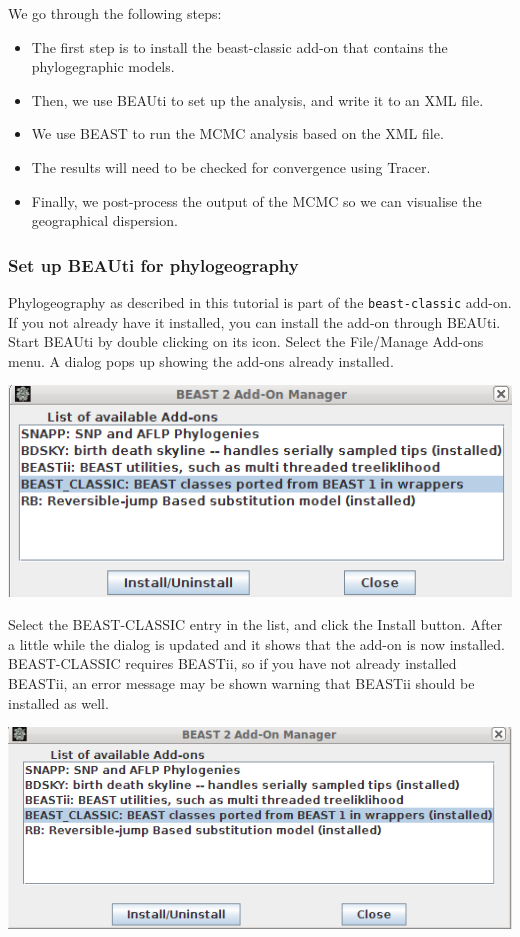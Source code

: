 \documentclass{article}
\begin{document}
We go through the following steps:
\begin{itemize}
\item The first step is to install the beast-classic add-on that contains the phylogegraphic models. 
\item Then, we use BEAUti to set up the analysis, and write it to an XML file.
\item We use BEAST to run the MCMC analysis based on the XML file.
\item The results will need to be checked for convergence using Tracer.
\item Finally, we post-process the output of the MCMC so we can visualise the geographical dispersion.
\end{itemize}

\subsubsection*{Set up BEAUti for phylogeography}

Phylogeography as described in this tutorial is part of the {\tt beast-classic} add-on.
If you not already have it installed, you can
install the add-on through BEAUti. Start BEAUti by double clicking on its icon. 
Select the File/Manage Add-ons menu. A dialog pops up showing the add-ons already installed. 

\begin{center}
\includegraphics[scale=0.4]{figures/addonmgr.png}
\end{center}

Select the BEAST-CLASSIC entry in the list, and click the Install button. After a little while the dialog is updated and it shows that the add-on is now installed.
BEAST-CLASSIC requires BEASTii, so if you have not already installed BEASTii, an error message may be shown warning that BEASTii should be installed as well.

\begin{center}
\includegraphics[scale=0.4]{figures/addonmgr2.png}
\end{center}
\end{document}
